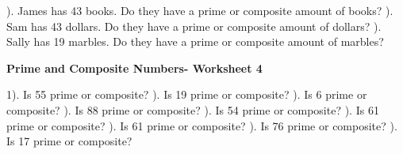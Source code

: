 \documentclass{article}%
\begin{document}
\newline%
). James has 43 books. Do they have a prime or composite amount of books?%
\newline%
\newline%
). Sam has 43 dollars. Do they have a prime or composite amount of dollars?%
\newline%
\newline%
). Sally has 19 marbles. Do they have a prime or composite amount of marbles?%
\newline%
\newline%
\newline%
\pagebreak%
\large%
\begin{center}%
\textbf{Prime and Composite Numbers- Worksheet 4}%
\newline%
\end{center} \normalsize%
1). Is 55 prime or composite?%
\newline%
\newline%
). Is 19 prime or composite?%
\newline%
\newline%
). Is 6 prime or composite?%
\newline%
\newline%
). Is 88 prime or composite?%
\newline%
\newline%
). Is 54 prime or composite?%
\newline%
\newline%
). Is 61 prime or composite?%
\newline%
\newline%
). Is 61 prime or composite?%
\newline%
\newline%
). Is 76 prime or composite?%
\newline%
\newline%
). Is 17 prime or composite?%
\newline%
\newline%
\end{document}
